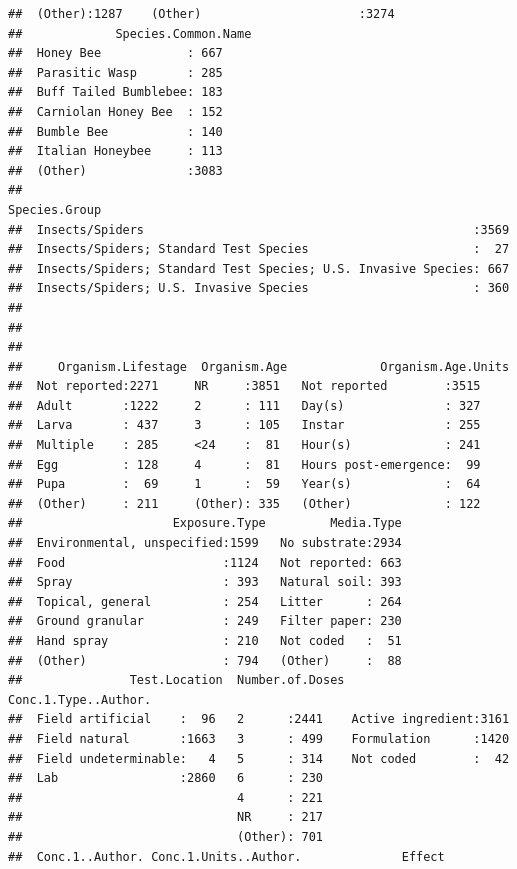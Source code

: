 \documentclass[]{article}
\begin{document}
\begin{verbatim}
##  (Other):1287    (Other)                      :3274      
##             Species.Common.Name
##  Honey Bee            : 667    
##  Parasitic Wasp       : 285    
##  Buff Tailed Bumblebee: 183    
##  Carniolan Honey Bee  : 152    
##  Bumble Bee           : 140    
##  Italian Honeybee     : 113    
##  (Other)              :3083    
##                                                        Species.Group 
##  Insects/Spiders                                              :3569  
##  Insects/Spiders; Standard Test Species                       :  27  
##  Insects/Spiders; Standard Test Species; U.S. Invasive Species: 667  
##  Insects/Spiders; U.S. Invasive Species                       : 360  
##                                                                      
##                                                                      
##                                                                      
##     Organism.Lifestage  Organism.Age             Organism.Age.Units
##  Not reported:2271     NR     :3851   Not reported        :3515    
##  Adult       :1222     2      : 111   Day(s)              : 327    
##  Larva       : 437     3      : 105   Instar              : 255    
##  Multiple    : 285     <24    :  81   Hour(s)             : 241    
##  Egg         : 128     4      :  81   Hours post-emergence:  99    
##  Pupa        :  69     1      :  59   Year(s)             :  64    
##  (Other)     : 211     (Other): 335   (Other)             : 122    
##                     Exposure.Type         Media.Type  
##  Environmental, unspecified:1599   No substrate:2934  
##  Food                      :1124   Not reported: 663  
##  Spray                     : 393   Natural soil: 393  
##  Topical, general          : 254   Litter      : 264  
##  Ground granular           : 249   Filter paper: 230  
##  Hand spray                : 210   Not coded   :  51  
##  (Other)                   : 794   (Other)     :  88  
##               Test.Location  Number.of.Doses        Conc.1.Type..Author.
##  Field artificial    :  96   2      :2441    Active ingredient:3161     
##  Field natural       :1663   3      : 499    Formulation      :1420     
##  Field undeterminable:   4   5      : 314    Not coded        :  42     
##  Lab                 :2860   6      : 230                               
##                              4      : 221                               
##                              NR     : 217                               
##                              (Other): 701                               
##  Conc.1..Author. Conc.1.Units..Author.              Effect    

\end{verbatim}
\end{document}
